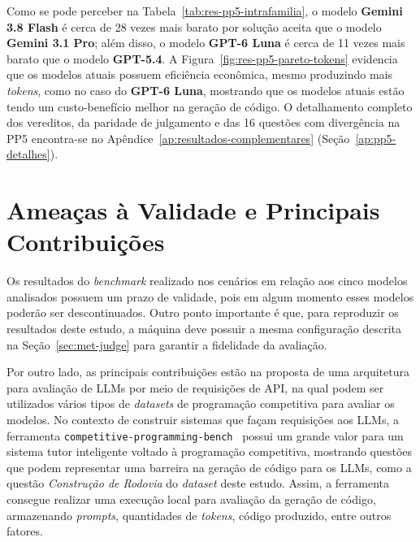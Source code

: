 Como se pode perceber na Tabela~\ref{tab:res-pp5-intrafamilia}, o modelo \textbf{Gemini 3.8 Flash} é cerca de 28 vezes mais barato por solução aceita que o modelo \textbf{Gemini 3.1 Pro}; além disso, o modelo \textbf{GPT-6 Luna} é cerca de 11 vezes mais barato que o modelo \textbf{GPT-5.4}. A Figura~\ref{fig:res-pp5-pareto-tokens} evidencia que os modelos atuais possuem eficiência econômica, mesmo produzindo mais \textit{tokens}, como no caso do \textbf{GPT-6 Luna}, mostrando que os modelos atuais estão tendo um custo-benefício melhor na geração de código. O detalhamento completo dos vereditos, da paridade de julgamento e das 16 questões com divergência na PP5 encontra-se no Apêndice~\ref{ap:resultados-complementares} (Seção~\ref{ap:pp5-detalhes}).

\section{Ameaças à Validade e Principais Contribuições}\label{sec:res-sintese}

Os resultados do \textit{benchmark} realizado nos cenários em relação aos cinco modelos analisados possuem um prazo de validade, pois em algum momento esses modelos poderão ser descontinuados. Outro ponto importante é que, para reproduzir os resultados deste estudo, a máquina deve possuir a mesma configuração descrita na Seção~\ref{sec:met-judge} para garantir a fidelidade da avaliação.

Por outro lado, as principais contribuições estão na proposta de uma arquitetura para avaliação de LLMs por meio de requisições de API, na qual podem ser utilizados vários tipos de \textit{datasets} de programação competitiva para avaliar os modelos. No contexto de construir sistemas que façam requisições aos LLMs, a ferramenta \texttt{competitive-programming-bench}~\citep{compbench2026} possui um grande valor para um sistema tutor inteligente voltado à programação competitiva, mostrando questões que podem representar uma barreira na geração de código para os LLMs, como a questão \textit{Construção de Rodovia} do \textit{dataset} deste estudo. Assim, a ferramenta consegue realizar uma execução local para avaliação da geração de código, armazenando \textit{prompts}, quantidades de \textit{tokens}, código produzido, entre outros fatores.
